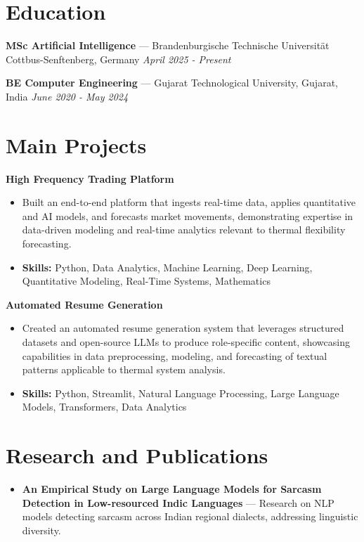 \documentclass[a4paper,10pt]{article}
\begin{document}
\section*{Education}
\textbf{MSc Artificial Intelligence} — Brandenburgische Technische Universität Cottbus-Senftenberg, Germany \hfill \textit{April 2025 - Present}\par
\vspace{1.5pt}
\textbf{BE Computer Engineering} — Gujarat Technological University, Gujarat, India \hfill \textit{June 2020 - May 2024}\par

\section*{Main Projects}
\textbf{High Frequency Trading Platform}\par
\vspace{1pt}
\begin{itemize}
  \item Built an end-to-end platform that ingests real-time data, applies quantitative and AI models, and forecasts market movements, demonstrating expertise in data-driven modeling and real-time analytics relevant to thermal flexibility forecasting.
  \item \textbf{Skills:} Python, Data Analytics, Machine Learning, Deep Learning, Quantitative Modeling, Real-Time Systems, Mathematics
\end{itemize}
\vspace{3pt}
\textbf{Automated Resume Generation}\par
\vspace{1pt}
\begin{itemize}
  \item Created an automated resume generation system that leverages structured datasets and open-source LLMs to produce role-specific content, showcasing capabilities in data preprocessing, modeling, and forecasting of textual patterns applicable to thermal system analysis.
  \item \textbf{Skills:} Python, Streamlit, Natural Language Processing, Large Language Models, Transformers, Data Analytics
\end{itemize}

\section*{Research and Publications}
\begin{itemize}
\item \textbf{An Empirical Study on Large Language Models for Sarcasm Detection in Low-resourced Indic Languages} — Research on NLP models detecting sarcasm across Indian regional dialects, addressing linguistic diversity.
\end{itemize}
\end{document}
